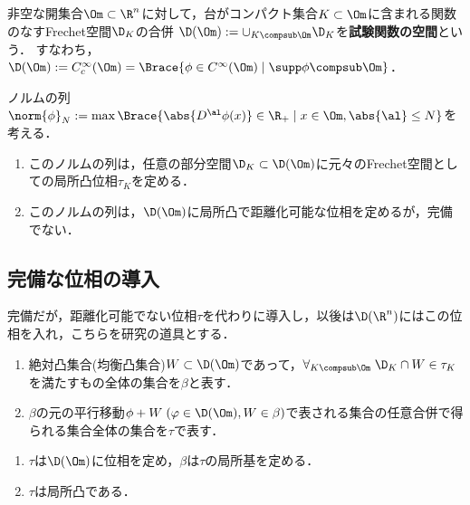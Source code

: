 \documentclass[uplatex,dvipdfmx]{jsreport}
\begin{document}
\begin{definition}
    非空な開集合$\Om\subset\R^n$に対して，台がコンパクト集合$K\subset\Om$に含まれる関数のなすFrechet空間$\D_K$の合併
    $\D(\Om):=\cup_{K\compsub\Om}\D_K$を\textbf{試験関数の空間}という．
    すなわち，$\D(\Om):=C^\infty_c(\Om)=\Brace{\phi\in C^\infty(\Om)\mid\supp\phi\compsub\Om}$．
\end{definition}

\begin{lemma}
    ノルムの列$\norm{\phi}_N:=\max\Brace{\abs{D^\al\phi(x)}\in\R_+\mid x\in\Om,\abs{\al}\le N}$を考える．
    \begin{enumerate}
        \item このノルムの列は，任意の部分空間$\D_K\subset\D(\Om)$に元々のFrechet空間としての局所凸位相$\tau_K$を定める．
        \item このノルムの列は，$\D(\Om)$に局所凸で距離化可能な位相を定めるが，完備でない．
    \end{enumerate}
\end{lemma}

\subsection{完備な位相の導入}

\begin{tcolorbox}[colframe=ForestGreen, colback=ForestGreen!10!white,breakable,colbacktitle=ForestGreen!40!white,coltitle=black,fonttitle=\bfseries\sffamily,
title=]
    完備だが，距離化可能でない位相$\tau$を代わりに導入し，以後は$\D(\R^n)$にはこの位相を入れ，こちらを研究の道具とする．
\end{tcolorbox}

\begin{definition}\mbox{}
    \begin{enumerate}
        \item 絶対凸集合(均衡凸集合)$W\subset\D(\Om)$であって，$\forall_{K\compsub\Om}\;\D_K\cap W\in\tau_K$を満たすもの全体の集合を$\beta$と表す．
        \item $\beta$の元の平行移動$\phi+W\;(\varphi\in\D(\Om),W\in\beta)$で表される集合の任意合併で得られる集合全体の集合を$\tau$で表す．
    \end{enumerate}
\end{definition}

\begin{theorem}\mbox{}\label{thm-topology-on-the-space-of-test-functions}
    \begin{enumerate}
        \item $\tau$は$\D(\Om)$に位相を定め，$\beta$は$\tau$の局所基を定める．
        \item $\tau$は局所凸である．
    \end{enumerate}
\end{theorem}
\end{document}
